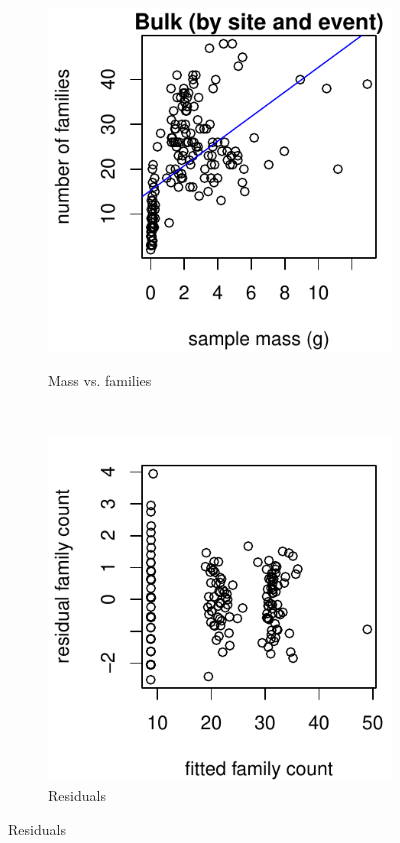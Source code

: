 \documentclass[10pt,letterpaper,twocolumn]{article}
\begin{document}
\begin{figure}[h]
	\centering
	\begin{subfigure}[b]{0.15\textwidth}
		\caption{Mass vs. families}
		\includegraphics[width=\textwidth]{plots/bulk/2015_bulk_scatter.pdf}
		\label{fig:bulk_scatter}
	\end{subfigure}
	~
	\begin{subfigure}[b]{0.15\textwidth}
		\caption{Residuals}
		\includegraphics[width=\textwidth]{plots//bulk/2015_bulk_residual.pdf}

\end{subfigure}
\end{figure}
\end{document}
